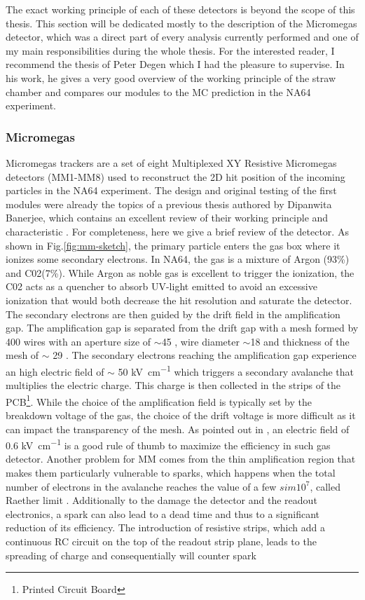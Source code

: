 The exact working principle of each of these detectors is beyond the scope of this thesis. This section will be dedicated mostly to the description of the Micromegas detector, which was a direct part of every analysis currently performed and one of my main responsibilities during the whole thesis. For the interested reader, I recommend the thesis of Peter Degen \cite{pdegen-thesis} which I had the pleasure to supervise. In his work, he gives a very good overview of the working principle of the straw chamber and compares our modules to the MC prediction in the NA64 experiment.

\subsubsection{Micromegas}

Micromegas trackers are a set of eight Multiplexed XY Resistive Micromegas detectors (MM1-MM8) used to reconstruct the 2D hit position of the incoming particles in the NA64 experiment. The design and original testing of the first modules were already the topics of a previous thesis authored by Dipanwita Banerjee, which contains an excellent review of their working principle and characteristic \cite{dbanerjee-thesis}. For completeness, here we give a brief review of the detector. As shown in Fig.\ref{fig:mm-sketch}, the primary particle enters the gas box where it ionizes some secondary electrons. In NA64, the gas is a mixture of Argon (93\%) and C02(7\%). While Argon as noble gas is excellent to trigger the ionization, the C02 acts as a quencher to absorb UV-light emitted to avoid an excessive ionization that would both decrease the hit resolution and saturate the detector. The secondary electrons are then guided by the drift field in the amplification gap. The amplification gap is separated from the drift gap with a mesh formed by 400 wires with an aperture size of $\sim$45 \mum, wire diameter $\sim$18 \mum and thickness of the mesh of $\sim$ 29 \mum. The secondary electrons reaching the amplification gap experience an high electric field of $\sim$ 50 \si{\kilo\volt\per\centi\metre} which triggers a secondary avalanche that multiplies the electric charge. This charge is then collected in the strips of the PCB\footnote{Printed Circuit Board}. While the choice of the amplification field is typically set by the breakdown voltage of the gas, the choice of the drift voltage is more difficult as it can impact the transparency of the mesh. As pointed out in \cite{Bortfeldt:2014vvt}, an electric field of 0.6 \si{\kilo\volt\per\centi\metre} is a good rule of thumb to maximize the efficiency in such gas detector. Another problem for MM comes from the thin amplification region that makes them particularly vulnerable to sparks, which happens when the total number of electrons in the avalanche reaches the value of a few $sim 10^7$, called Raether limit \cite{BAY2002162,BRESSAN1999321,Raether:102989}. Additionally to the damage the detector and the readout electronics, a spark can also lead to a dead time and thus to a significant reduction of its efficiency. The introduction of resistive strips, which add a continuous RC circuit on the top of the readout strip plane, leads to the spreading of charge and consequentially will counter spark 